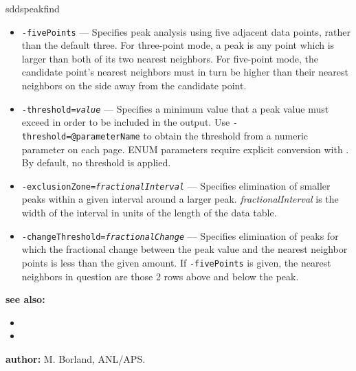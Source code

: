 \begin{sddsprog}{sddspeakfind}
\begin{itemize}
      \item \verb|-fivePoints| --- Specifies peak analysis using five adjacent data points, rather than
        the default three.  For three-point mode, a peak is any point which is larger than both of
        its two nearest neighbors.  For five-point mode, the candidate point's nearest neighbors must in turn
        be higher than their nearest neighbors on the side away from the candidate point.
      \item {\tt -threshold={\em value}} --- Specifies a minimum value that a peak value must exceed in order
        to be included in the output. Use \verb|-threshold=@parameterName| to obtain the threshold from a numeric parameter on each page. ENUM parameters require explicit conversion with . By default, no threshold is applied.
      \item {\tt -exclusionZone={\em fractionalInterval}} --- Specifies elimination of smaller peaks within a given interval
        around a larger peak.  {\em fractionalInterval} is the width of the interval in units of the length of the data table.
      \item {\tt -changeThreshold={\em fractionalChange}} --- Specifies elimination of peaks for which the fractional
        change between the peak value and the nearest neighbor points is less than the given amount.  If
        \verb|-fivePoints| is given, the nearest neighbors in question are those 2 rows above and below the
        peak.
    \end{itemize}
  \item \textbf{see also:}
    \begin{itemize}
      \item {}
      \item {}
    \end{itemize}
  \item \textbf{author:} M. Borland, ANL/APS.
\end{sddsprog}

